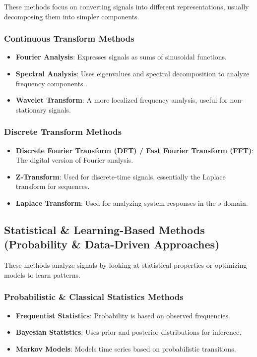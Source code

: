 \documentclass{article}
\begin{document}
These methods focus on converting signals into different representations, usually decomposing them into simpler components.

\subsubsection{Continuous Transform Methods}

\begin{itemize}
    \item \textbf{Fourier Analysis}: Expresses signals as sums of sinusoidal functions.
    \item \textbf{Spectral Analysis}: Uses eigenvalues and spectral decomposition to analyze frequency components.
    \item \textbf{Wavelet Transform}: A more localized frequency analysis, useful for non-stationary signals.
\end{itemize}

\subsubsection{Discrete Transform Methods}

\begin{itemize}
    \item \textbf{Discrete Fourier Transform (DFT) / Fast Fourier Transform (FFT)}: The digital version of Fourier analysis.
    \item \textbf{Z-Transform}: Used for discrete-time signals, essentially the Laplace transform for sequences.
    \item \textbf{Laplace Transform}: Used for analyzing system responses in the \(s\)-domain.
\end{itemize}

\subsection{Statistical \& Learning-Based Methods (Probability \& Data-Driven Approaches)}

These methods analyze signals by looking at statistical properties or optimizing models to learn patterns.

\subsubsection{Probabilistic \& Classical Statistics Methods}

\begin{itemize}
    \item \textbf{Frequentist Statistics}: Probability is based on observed frequencies.
    \item \textbf{Bayesian Statistics}: Uses prior and posterior distributions for inference.
    \item \textbf{Markov Models}: Models time series based on probabilistic transitions.
\end{itemize}
\end{document}
